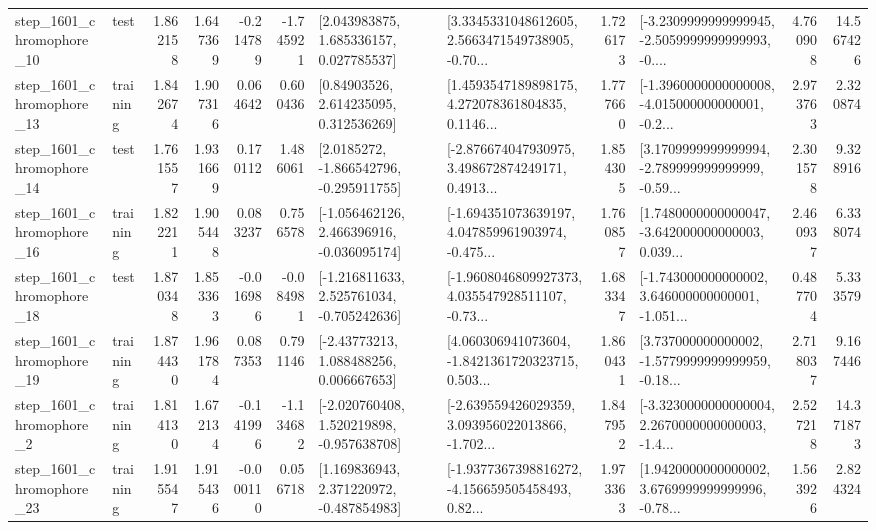 \begin{tabular}{llrrrrllrlrr}
 step\_1601\_chromophore\_10 &      test &      1.862158 &    1.647369 &     -0.214789 & -1.745921 &     [2.043983875, 1.685336157, 0.027785537] &  [3.3345331048612605, 2.5663471549738905, -0.70... &       1.726173 &  [-3.2309999999999945, -2.5059999999999993, -0.... &            4.760908 &         14.567426 \\
 step\_1601\_chromophore\_13 &  training &      1.842674 &    1.907316 &      0.064642 &  0.600436 &      [0.84903526, 2.614235095, 0.312536269] &  [1.4593547189898175, 4.272078361804835, 0.1146... &       1.777660 &  [-1.3960000000000008, -4.015000000000001, -0.2... &            2.973763 &          2.320874 \\
 step\_1601\_chromophore\_14 &      test &      1.761557 &    1.931669 &      0.170112 &  1.486061 &     [2.0185272, -1.866542796, -0.295911755] &  [-2.876674047930975, 3.498672874249171, 0.4913... &       1.854305 &  [3.1709999999999994, -2.789999999999999, -0.59... &            2.301578 &          9.328916 \\
 step\_1601\_chromophore\_16 &  training &      1.822211 &    1.905448 &      0.083237 &  0.756578 &   [-1.056462126, 2.466396916, -0.036095174] &  [-1.694351073639197, 4.047859961903974, -0.475... &       1.760857 &  [1.7480000000000047, -3.642000000000003, 0.039... &            2.460937 &          6.338074 \\
 step\_1601\_chromophore\_18 &      test &      1.870348 &    1.853363 &     -0.016986 & -0.084981 &   [-1.216811633, 2.525761034, -0.705242636] &  [-1.9608046809927373, 4.035547928511107, -0.73... &       1.683347 &  [-1.743000000000002, 3.646000000000001, -1.051... &            0.487704 &          5.333579 \\
 step\_1601\_chromophore\_19 &  training &      1.874430 &    1.961784 &      0.087353 &  0.791146 &     [-2.43773213, 1.088488256, 0.006667653] &  [4.060306941073604, -1.8421361720323715, 0.503... &       1.860431 &  [3.737000000000002, -1.5779999999999959, -0.18... &            2.718037 &          9.167446 \\
  step\_1601\_chromophore\_2 &  training &      1.814130 &    1.672134 &     -0.141996 & -1.134682 &   [-2.020760408, 1.520219898, -0.957638708] &  [-2.639559426029359, 3.093956022013866, -1.702... &       1.847952 &  [-3.3230000000000004, 2.2670000000000003, -1.4... &            2.527218 &         14.371873 \\
 step\_1601\_chromophore\_23 &  training &      1.915547 &    1.915436 &     -0.000110 &  0.056718 &    [1.169836943, 2.371220972, -0.487854983] &  [-1.9377367398816272, -4.156659505458493, 0.82... &       1.973363 &  [1.9420000000000002, 3.6769999999999996, -0.78... &            1.563926 &          2.824324 \\

\end{tabular}

